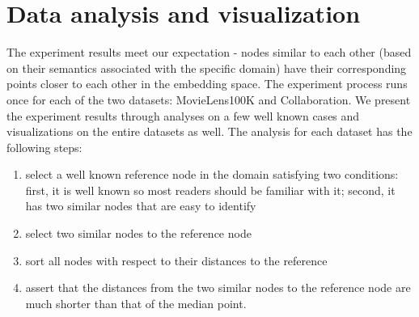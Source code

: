 \documentclass[conference]{IEEEtran}
\begin{document}
\section{Data analysis and visualization}
The experiment results meet our expectation - nodes similar to each other (based on their semantics associated with the specific domain) have their corresponding points closer to each other in the embedding space.
The experiment process runs once for each of the two datasets: MovieLens100K and Collaboration.
We present the experiment results through analyses on a few well known cases and visualizations on the entire datasets as well.
The analysis for each dataset has the following steps:
\begin{enumerate}
	\item select a well known reference node in the domain satisfying two conditions: first, it is well known so most readers should be familiar with it; second, it has two similar nodes that are easy to identify
	\item select two similar nodes to the reference node
	\item sort all nodes with respect to their distances to the reference
	\item assert that the distances from the two similar nodes to the reference node are much shorter than that of the median point.
\end{enumerate}
\end{document}
